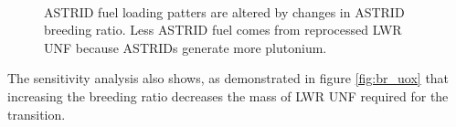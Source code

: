 \begin{figure}[!ht]
	\centering
	\quad
	\\
	\quad
	\caption{\gls{ASTRID} fuel loading patters are altered by changes in \gls{ASTRID} 
		breeding ratio. Less \gls{ASTRID} fuel comes from reprocessed \gls{LWR} \gls{UNF}
		because \glspl{ASTRID} generate more plutonium.}
	\label{fig:br_fuel}
\end{figure}

The sensitivity analysis also shows, as demonstrated in figure \ref{fig:br_uox} that 
increasing the breeding ratio decreases the mass of \gls{LWR} \gls{UNF} 
required for the transition.

